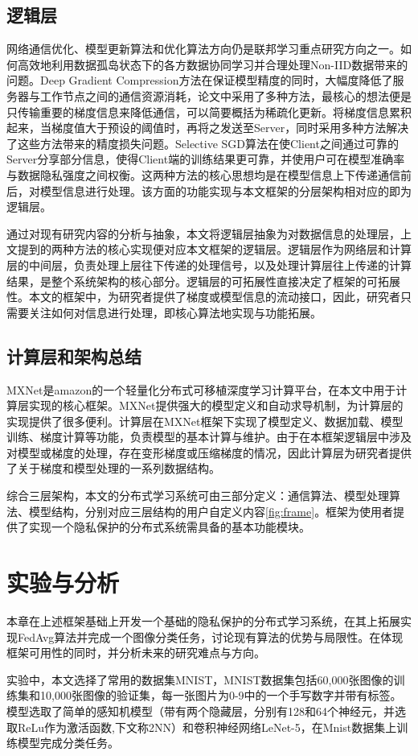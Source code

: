 \documentclass[zihao = -4,cn]{oucart}
\begin{document}
\subsection{逻辑层}
网络通信优化、模型更新算法和优化算法方向仍是联邦学习重点研究方向之一。如何高效地利用数据孤岛状态下的各方数据协同学习并合理处理Non-IID数据带来的问题。Deep Gradient Compression\cite{lin2017deep}方法在保证模型精度的同时，大幅度降低了服务器与工作节点之间的通信资源消耗，论文中采用了多种方法，最核心的想法便是只传输重要的梯度信息来降低通信，可以简要概括为稀疏化更新。将梯度信息累积起来，当梯度值大于预设的阈值时，再将之发送至Server，同时采用多种方法解决了这些方法带来的精度损失问题。Selective SGD\cite{shokri2015privacy}算法在使Client之间通过可靠的Server分享部分信息，使得Client端的训练结果更可靠，并使用户可在模型准确率与数据隐私强度之间权衡。这两种方法的核心思想均是在模型信息上下传递通信前后，对模型信息进行处理。该方面的功能实现与本文框架的分层架构相对应的即为逻辑层。\par
通过对现有研究内容的分析与抽象，本文将逻辑层抽象为对数据信息的处理层，上文提到的两种方法的核心实现便对应本文框架的逻辑层。逻辑层作为网络层和计算层的中间层，负责处理上层往下传递的处理信号，以及处理计算层往上传递的计算结果，是整个系统架构的核心部分。逻辑层的可拓展性直接决定了框架的可拓展性。本文的框架中，为研究者提供了梯度或模型信息的流动接口，因此，研究者只需要关注如何对信息进行处理，即核心算法地实现与功能拓展。\par
\subsection{计算层和架构总结}
MXNet是amazon的一个轻量化分布式可移植深度学习计算平台，在本文中用于计算层实现的核心框架。MXNet提供强大的模型定义和自动求导机制，为计算层的实现提供了很多便利。计算层在MXNet框架下实现了模型定义、数据加载、模型训练、梯度计算等功能，负责模型的基本计算与维护。由于在本框架逻辑层中涉及对模型或梯度的处理，存在变形梯度或压缩梯度的情况，因此计算层为研究者提供了关于梯度和模型处理的一系列数据结构。\par
综合三层架构，本文的分布式学习系统可由三部分定义：通信算法、模型处理算法、模型结构，分别对应三层结构的用户自定义内容\ref{fig:frame}。框架为使用者提供了实现一个隐私保护的分布式系统需具备的基本功能模块。\par


\section{实验与分析}
本章在上述框架基础上开发一个基础的隐私保护的分布式学习系统，在其上拓展实现FedAvg算法并完成一个图像分类任务，讨论现有算法的优势与局限性。在体现框架可用性的同时，并分析未来的研究难点与方向。\par
实验中，本文选择了常用的数据集MNIST，MNIST数据集包括60,000张图像的训练集和10,000张图像的验证集，每一张图片为0-9中的一个手写数字并带有标签。模型选取了简单的感知机模型（带有两个隐藏层，分别有128和64个神经元，并选取ReLu作为激活函数,下文称2NN）和卷积神经网络LeNet-5\cite{lecun2015lenet}，在Mnist数据集上训练模型完成分类任务。\par
\end{document}
